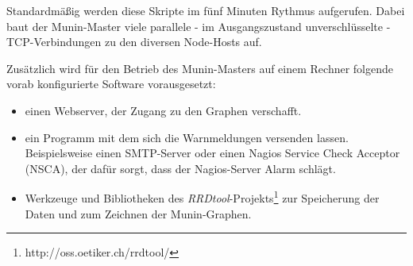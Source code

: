 Standardmäßig werden diese Skripte im fünf Minuten Rythmus aufgerufen.
Dabei baut der Munin-Master viele parallele - im Ausgangszustand unverschlüsselte - TCP-Verbindungen zu den diversen Node-Hosts auf.

Zusätzlich wird für den Betrieb des Munin-Masters auf einem Rechner folgende vorab konfigurierte Software vorausgesetzt:

\begin{itemize}
\item einen Webserver, der Zugang zu den Graphen verschafft.
\item ein Programm mit dem sich die Warnmeldungen versenden lassen. Beispielsweise einen SMTP-Server oder einen Nagios Service Check Acceptor (NSCA), der dafür sorgt, dass der Nagios-Server Alarm schlägt.
\item Werkzeuge und Bibliotheken des \textit{RRDtool}-Projekts\footnote{http://oss.oetiker.ch/rrdtool/} zur Speicherung der Daten und zum Zeichnen der Munin-Graphen.
\end{itemize}




















